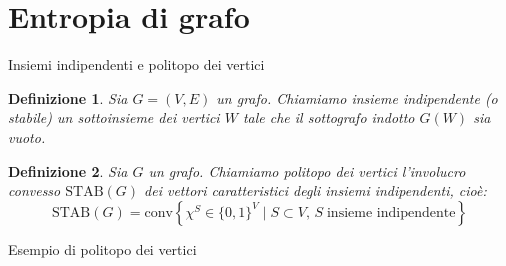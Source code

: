 \documentclass[10pt]{beamer}
\newtheorem{definizione}{Definizione}
\begin{document}
\section{Entropia di grafo}
\begin{frame}
  {Insiemi indipendenti e politopo dei vertici}
  \begin{definizione}
    Sia \(G=(V,E)\) un grafo. Chiamiamo \emph{insieme indipendente} (o 
    \emph{stabile}) un sottoinsieme dei vertici \(W\) tale che il sottografo 
    indotto \(G(W)\) sia vuoto.
  \end{definizione}
  \vspace{5mm}
  \begin{definizione}
    Sia \(G\) un grafo. Chiamiamo \emph{politopo dei vertici} l'involucro 
    convesso \(\text{STAB}(G)\) dei vettori caratteristici degli insiemi 
    indipendenti, cioè:
    \[\text{STAB}(G) = \text{conv}\left\{\chi^S\in\{0,1\}^V\mid S\subset V,\, S\;\text{insieme indipendente}\right\}\]
  \end{definizione}
\end{frame}

\begin{frame}
  {Esempio di politopo dei vertici}
  \begin{figure}
    \centering
  \end{figure}
\end{frame}
\end{document}
